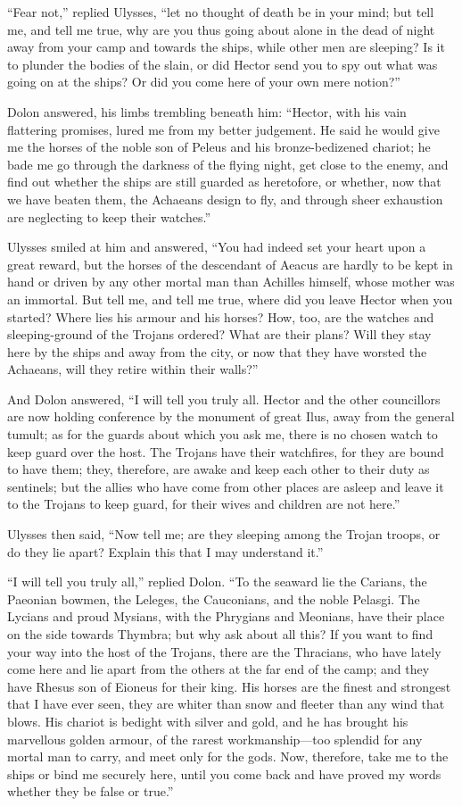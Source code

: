 “Fear not,” replied Ulysses, “let no thought of death be in your mind; but
tell me, and tell me true, why are you thus going about alone in the dead
of night away from your camp and towards the ships, while other men are
sleeping? Is it to plunder the bodies of the slain, or did Hector send you
to spy out what was going on at the ships? Or did you come here of your
own mere notion?”

Dolon answered, his limbs trembling beneath him: “Hector, with his vain
flattering promises, lured me from my better judgement. He said he would
give me the horses of the noble son of Peleus and his bronze-bedizened
chariot; he bade me go through the darkness of the flying night, get close
to the enemy, and find out whether the ships are still guarded as
heretofore, or whether, now that we have beaten them, the Achaeans design
to fly, and through sheer exhaustion are neglecting to keep their
watches.”

Ulysses smiled at him and answered, “You had indeed set your heart upon a
great reward, but the horses of the descendant of Aeacus are hardly to be
kept in hand or driven by any other mortal man than Achilles himself,
whose mother was an immortal. But tell me, and tell me true, where did you
leave Hector when you started? Where lies his armour and his horses? How,
too, are the watches and sleeping-ground of the Trojans ordered? What are
their plans? Will they stay here by the ships and away from the city, or
now that they have worsted the Achaeans, will they retire within their
walls?”

And Dolon answered, “I will tell you truly all. Hector and the other
councillors are now holding conference by the monument of great Ilus, away
from the general tumult; as for the guards about which you ask me, there
is no chosen watch to keep guard over the host. The Trojans have their
watchfires, for they are bound to have them; they, therefore, are awake
and keep each other to their duty as sentinels; but the allies who have
come from other places are asleep and leave it to the Trojans to keep
guard, for their wives and children are not here.”

Ulysses then said, “Now tell me; are they sleeping among the Trojan
troops, or do they lie apart? Explain this that I may understand it.”

“I will tell you truly all,” replied Dolon. “To the seaward lie the
Carians, the Paeonian bowmen, the Leleges, the Cauconians, and the noble
Pelasgi. The Lycians and proud Mysians, with the Phrygians and Meonians,
have their place on the side towards Thymbra; but why ask about all this?
If you want to find your way into the host of the Trojans, there are the
Thracians, who have lately come here and lie apart from the others at the
far end of the camp; and they have Rhesus son of Eioneus for their king.
His horses are the finest and strongest that I have ever seen, they are
whiter than snow and fleeter than any wind that blows. His chariot is
bedight with silver and gold, and he has brought his marvellous golden
armour, of the rarest workmanship—too splendid for any mortal man to
carry, and meet only for the gods. Now, therefore, take me to the ships or
bind me securely here, until you come back and have proved my words
whether they be false or true.”

